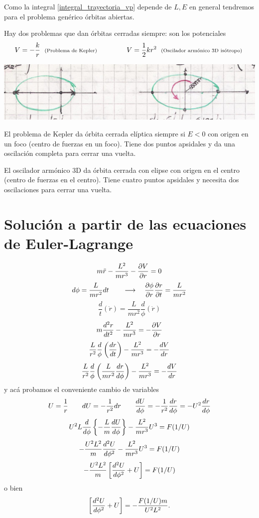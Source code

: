 \documentclass[10pt,oneside]{CBFT_book}
\begin{document}

Como la integral \eqref{integral_trayectoria_vp} depende de $L, E$ en general tendremos para el problema genérico órbitas
abiertas.

Hay dos problemas que dan órbitas cerradas siempre: son los potenciales 
\[
	V = -\frac{k}{r} \; \text{ \scriptsize{(Problema de Kepler)} } \qquad \qquad 
	V = \frac{ 1 }{2} k r^2 \; \text{ \scriptsize{(Oscilador armónico 3D isótropo) }}
\]

\includegraphics[scale=0.3]{images/fig_mc_orbitas_simetria_6.jpg}

El problema de Kepler da órbita cerrada elíptica siempre si $ E < 0 $ con origen en un foco (centro de fuerzas en un foco).
Tiene dos puntos apsidales y da una oscilación completa para cerrar una vuelta.

El oscilador armónico 3D da órbita cerrada con elipse con origen en el centro (centro de fuerzas en el centro). Tiene 
cuatro puntos apsidales y necesita dos oscilaciones para cerrar una vuelta.


\section{Solución a partir de las ecuaciones de Euler-Lagrange}

\[
	m \ddot{r} -\frac{L^2}{m r^3} -\dpar{V}{r}= 0 
\]
\[
	d \phi = \frac{L}{m r^2} dt \qquad \longrightarrow \quad  \dpar{\phi}{r}\dpar{r}{t}  = \frac{L}{m r^2}
\]
\[
	\frac{d}{t}(\dot{r}) = \frac{L}{m r^2} \frac{d}{\phi}(\dot{r})
\]
\[
	m \dtot[2]{r}{t} -\frac{L^2}{m r^3} = -\dpar{V}{r}
\]
\[
	\frac{L}{r^2} \frac{d}{\phi}\left( \dtot{r}{t} \right) -\frac{L^2}{m r^3} = -\dtot{V}{r}
\]
\[
	\frac{L}{r^2} \frac{d}{\phi}\left( \frac{L}{m r^2}\dtot{r}{\phi} \right) -\frac{L^2}{m r^3} = -\dtot{V}{r}
\]
y acá probamos el conveniente cambio de variables
\[
	U = \frac{1}{r} \qquad dU = -\frac{1}{r^2} dr 
	\qquad \dtot{U}{\phi} = -\frac{1}{r^2}\dtot{r}{\phi} = -U^2\dtot{r}{\phi}
\]
\[
	U^2 L \frac{d}{d\phi} \left\{ -\frac{L}{m}\dtot{U}{\phi} \right\} - \frac{L^2}{m r^3} U^3 = F(1/U)
\]
\[
	- \frac{U^2 L^2}{m} \dtot[2]{U}{\phi} - \frac{L^2}{m r^3} U^3 = F(1/U)
\]
\[
	- \frac{U^2 L^2}{m} \left[ \dtot[2]{U}{\phi} + U \right] = F(1/U)
\]
o bien
\[
	\left[ \dtot[2]{U}{\phi} + U \right] = - \frac{F(1/U) m}{U^2 L^2}. 
\]
\end{document}
